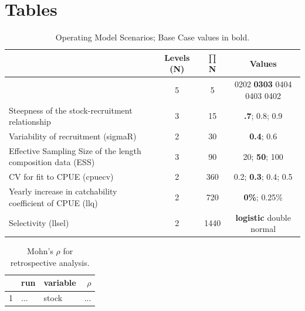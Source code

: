 \clearpage
\newpage
\section{Tables}

\begin{table}[!ht]
\label{tab:grid}
\caption{Operating Model Scenarios; Base Case values in bold.}  
\begin{center}
\label{tab:datasumm}
\begin{tabular}{|lccc|}
\hline
& {\tiny Levels (N)} & {\tiny $\prod$ N} & {\tiny Values} \\ %
\hline\hline
{\tiny Natural mortality (M)& {\tiny 5}}  & {\tiny   5}  & {\tiny  0202  \textbf{0303} 0404 0403 0402}    \\
{\tiny Steepness of the stock-recruitment relationship}}& {\tiny 3} 	 & {\tiny 15}  & {\tiny  \textbf{.7}; 0.8; 0.9} \\
{\tiny Variability of recruitment (sigmaR)}& {\tiny 2} 	 & {\tiny  30}  & {\tiny  \textbf{0.4}; 0.6} \\
{\tiny Effective Sampling Size of the length composition data (ESS)}& {\tiny 3} & {\tiny  90}  & {\tiny  20; \textbf{50}; 100} \\
{\tiny CV for fit to CPUE (cpuecv)}& {\tiny 2} 	 & {\tiny  360}  & {\tiny  0.2;  \textbf{0.3}; 0.4; 0.5} \\
{\tiny Yearly increase in catchability coefficient of CPUE (llq)}& {\tiny 2} 	 & {\tiny   720}  & {\tiny  \textbf{0\%}; 0.25\%} \\
{\tiny Selectivity (llsel)}& {\tiny 2}}& {\tiny 1440}} & {\tiny  \textbf{logistic} double normal} \\
\hline

\end{tabular}
\end{center}
\end{table}

\begin{table}[!ht]
\caption{Mohn's $\rho$ for retrospective analysis.}  
\label{tab:retro}
\centering
\begin{tabular}{rllr}
  \hline
 & run & variable & $\rho$ \\ 
  \hline
  1 & ... & stock & ... \\ 
   \hline
\end{tabular}
\end{table}




